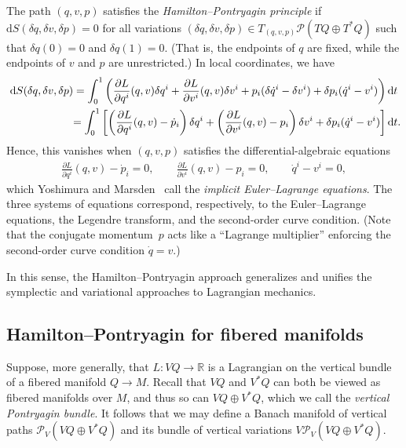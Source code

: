 \documentclass[10pt,a4paper]{amsart}
\numberwithin{equation}{section}
\begin{document}
The path $ ( q, v, p ) $ satisf\/ies the \emph{Hamilton--Pontryagin principle} if $ \mathrm{d} S ( \delta q, \delta v, \delta p ) = 0 $ for all variations $ ( \delta q, \delta v, \delta p ) \in T _{ ( q, v, p ) } \mathcal{P} ( T Q \oplus T ^\ast Q ) $ such that $ \delta q (0) = 0 $ and $ \delta q (1) = 0 $. (That is, the endpoints of $q$ are f\/ixed, while the endpoints of $v$ and $p$ are unrestricted.) In local coordinates, we have
\begin{gather*}
 \mathrm{d} S ( \delta q, \delta v , \delta p ) = \int _0 ^1 \left( \frac{ \partial L }{ \partial q ^i } ( q, v ) \delta q ^i + \frac{ \partial L }{ \partial v ^i } ( q, v ) \delta v ^i + p _i ( \delta \dot{q} ^i - \delta v ^i ) + \delta p _i ( \dot{q} ^i - v ^i ) \right) \mathrm{d}t \\
\hphantom{\mathrm{d} S ( \delta q, \delta v , \delta p )}{} = \int _0 ^1 \left[ \left( \frac{ \partial L }{ \partial q ^i } (
 q, v ) - \dot{p} _i \right) \delta q ^i + \left( \frac{ \partial L }{ \partial v ^i } ( q, v ) - p _i \right) \delta v ^i + \delta p _i
 ( \dot{q} ^i - v ^i ) \right] \mathrm{d}t .
\end{gather*}
Hence, this vanishes when $ ( q, v, p ) $ satisf\/ies the dif\/ferential-algebraic equations
\begin{gather*}
 \frac{ \partial L }{ \partial q ^i } ( q, v ) - \dot{p} _i = 0 , \qquad \frac{ \partial L }{ \partial v ^i } ( q, v ) - p _i = 0 , \qquad \dot{q} ^i - v ^i = 0 ,
\end{gather*}
which Yoshimura and Marsden~\cite{YoMa2006b} call the \emph{implicit Euler--Lagrange equations}. The three systems of equations correspond, respectively,
to the Euler--Lagrange equations, the Legendre transform, and the second-order curve condition. (Note that the conjugate momentum~$ p $ acts like a ``Lagrange multiplier'' enforcing the second-order curve condition $ \dot{q} = v $.)

In this sense, the Hamilton--Pontryagin approach generalizes and unif\/ies the symplectic and variational approaches to Lagrangian mechanics.

\subsection{Hamilton--Pontryagin for f\/ibered manifolds}\label{sec:hpFibered}

Suppose, more generally, that $ L \colon V Q \rightarrow \mathbb{R} $ is a Lagrangian on the vertical bundle of a f\/ibered manifold $ Q \rightarrow M $. Recall that $ V Q $ and $ V ^\ast Q $ can both be viewed as f\/ibered manifolds over $M$, and thus so can $ V Q \oplus V ^\ast Q $, which we call the \emph{vertical Pontryagin bundle}. It follows that we may def\/ine a Banach manifold of vertical paths $ \mathcal{P} _V ( V Q \oplus V ^\ast Q ) $ and its bundle of vertical variations $ V \mathcal{P} _V ( V Q \oplus V ^\ast Q ) $.
\end{document}
